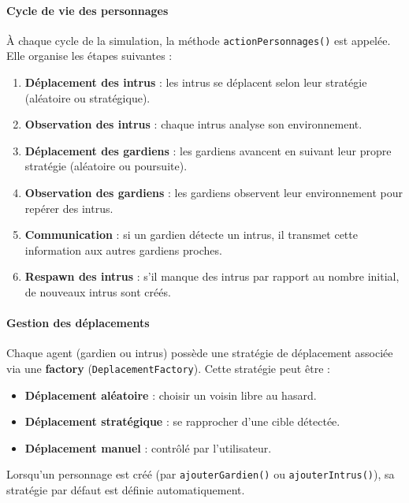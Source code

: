 \vspace{1em}
\paragraph{Cycle de vie des personnages}

À chaque cycle  de la simulation, la méthode \texttt{actionPersonnages()} est appelée. Elle organise les étapes suivantes :
\begin{enumerate}
    \item \textbf{Déplacement des intrus} : les intrus se déplacent selon leur stratégie (aléatoire ou stratégique).
    \item \textbf{Observation des intrus} : chaque intrus analyse son environnement.
    \item \textbf{Déplacement des gardiens} : les gardiens avancent en suivant leur propre stratégie (aléatoire ou poursuite).
    \item \textbf{Observation des gardiens} : les gardiens observent leur environnement pour repérer des intrus.
    \item \textbf{Communication} : si un gardien détecte un intrus, il transmet cette information aux autres gardiens proches.
    \item \textbf{Respawn des intrus} : s’il manque des intrus par rapport au nombre initial, de nouveaux intrus sont créés.
\end{enumerate}

\vspace{1em}
\paragraph{Gestion des déplacements}

Chaque agent (gardien ou intrus) possède une stratégie de déplacement associée via une \textbf{factory} (\texttt{DeplacementFactory}).  
Cette stratégie peut être :
\begin{itemize}
    \item \textbf{Déplacement aléatoire} : choisir un voisin libre au hasard.
    \item \textbf{Déplacement stratégique} : se rapprocher d'une cible détectée.
    \item \textbf{Déplacement manuel} : contrôlé par l'utilisateur.
\end{itemize}

Lorsqu'un personnage est créé (par \texttt{ajouterGardien()} ou \texttt{ajouterIntrus()}), sa stratégie par défaut est définie automatiquement.

